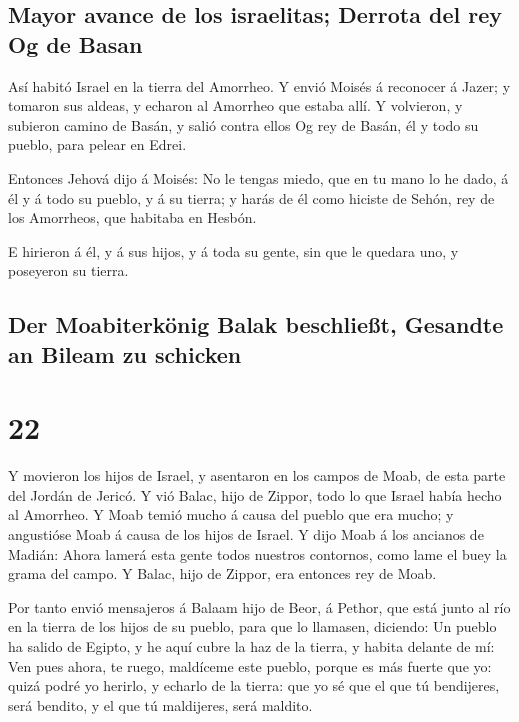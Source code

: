 \hypertarget{mayor-avance-de-los-israelitas-derrota-del-rey-og-de-basan}{%
\subsection{Mayor avance de los israelitas; Derrota del rey Og de
Basan}\label{mayor-avance-de-los-israelitas-derrota-del-rey-og-de-basan}}

 Así habitó Israel en la tierra del Amorrheo. 
Y envió Moisés á reconocer á Jazer; y tomaron sus aldeas, y echaron al
Amorrheo que estaba allí.  Y volvieron, y subieron camino
de Basán, y salió contra ellos Og rey de Basán, él y todo su pueblo,
para pelear en Edrei.

 Entonces Jehová dijo á Moisés: No le tengas miedo, que en
tu mano lo he dado, á él y á todo su pueblo, y á su tierra; y harás de
él como hiciste de Sehón, rey de los Amorrheos, que habitaba en Hesbón.

 E hirieron á él, y á sus hijos, y á toda su gente, sin que
le quedara uno, y poseyeron su tierra.

\hypertarget{der-moabiterkuxf6nig-balak-beschlieuxdft-gesandte-an-bileam-zu-schicken}{%
\subsection{Der Moabiterkönig Balak beschließt, Gesandte an Bileam zu
schicken}\label{der-moabiterkuxf6nig-balak-beschlieuxdft-gesandte-an-bileam-zu-schicken}}

\hypertarget{section-21}{%
\section{22}\label{section-21}}

 Y movieron los hijos de Israel, y asentaron en los campos
de Moab, de esta parte del Jordán de Jericó.  Y vió Balac,
hijo de Zippor, todo lo que Israel había hecho al Amorrheo. 
Y Moab temió mucho á causa del pueblo que era mucho; y angustióse Moab á
causa de los hijos de Israel.  Y dijo Moab á los ancianos de
Madián: Ahora lamerá esta gente todos nuestros contornos, como lame el
buey la grama del campo. Y Balac, hijo de Zippor, era entonces rey de
Moab.

 Por tanto envió mensajeros á Balaam hijo de Beor, á Pethor,
que está junto al río en la tierra de los hijos de su pueblo, para que
lo llamasen, diciendo: Un pueblo ha salido de Egipto, y he aquí cubre la
haz de la tierra, y habita delante de mí:  Ven pues ahora,
te ruego, maldíceme este pueblo, porque es más fuerte que yo: quizá
podré yo herirlo, y echarlo de la tierra: que yo sé que el que tú
bendijeres, será bendito, y el que tú maldijeres, será maldito.

